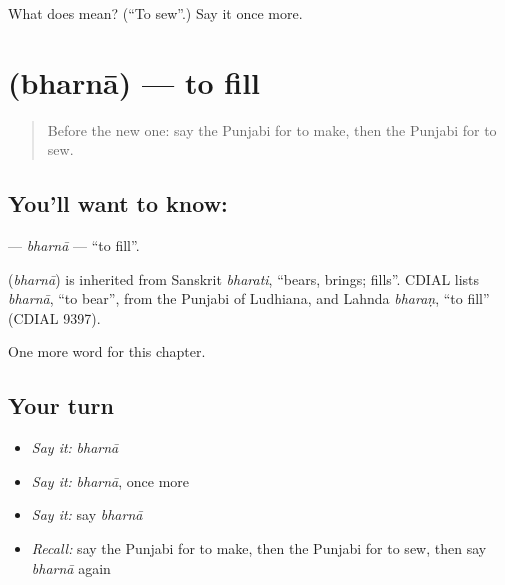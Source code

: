 \begin{tcolorbox}[breakable,colback=teal!4,colframe=teal!35!black,title={Before you move on}]
What does  mean? (\textquotedblleft{}To sew\textquotedblright{}.) Say it once more.
\end{tcolorbox}
\section[\texorpdfstring{\pa{ਭਰਨਾ} (bharnā)}{ਭਰਨਾ (bharnā)}]{ (bharnā) — to fill}

\label{lesson:PA-C150-bharna}



\begin{quote}
Before the new one: say the Punjabi for to make, then the Punjabi for to sew.
\end{quote}

\subsection*{You'll want to know: }
\textbf{} — \emph{bharnā} — \textquotedblleft{}to fill\textquotedblright{}.

\begin{cousinweb}
\textbf{} (\emph{bharnā}) is inherited from Sanskrit \emph{bharati}, \textquotedblleft{}bears, brings; fills\textquotedblright{}. CDIAL lists \emph{bharnā}, \textquotedblleft{}to bear\textquotedblright{}, from the Punjabi of Ludhiana, and Lahnda \emph{bharaṇ}, \textquotedblleft{}to fill\textquotedblright{} (CDIAL 9397).
\end{cousinweb}

\begin{grammarlens}[title={What you've built}]
One more word for this chapter.
\end{grammarlens}

\subsection*{Your turn}
\begin{itemize}
\raggedright
  \item \emph{Say it:} \emph{bharnā}
  \item \emph{Say it:} \emph{bharnā}, once more
  \item \emph{Say it:} say \emph{bharnā}
  \item \emph{Recall:} say the Punjabi for to make, then the Punjabi for to sew, then say \emph{bharnā} again
\end{itemize}

